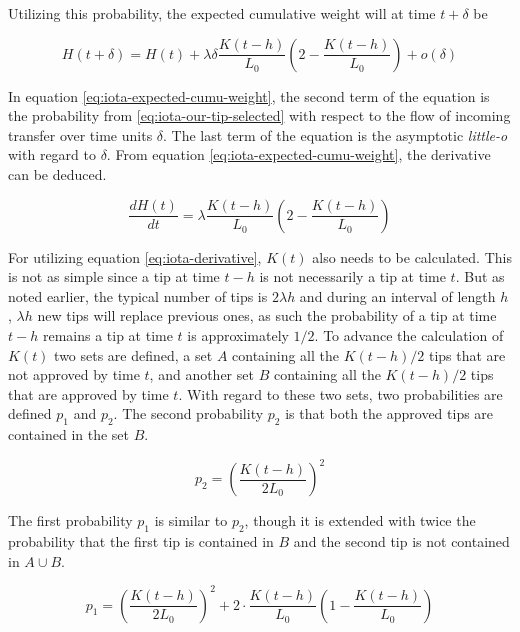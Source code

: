 Utilizing this probability, the expected cumulative weight will at time $t+\delta$ be

\begin{equation}
\label{eq:iota-expected-cumu-weight}
    H(t+ \delta) = H(t) + \lambda \delta \frac{K(t-h)}{L_0}\left(2-\frac{K(t-h)}{L_0}\right) + o(\delta)
\end{equation}

In equation \ref{eq:iota-expected-cumu-weight}, the second term of the equation is the probability from \ref{eq:iota-our-tip-selected} with respect to the flow of incoming transfer over time units $\delta$. The last term of the equation is the asymptotic \emph{little-o} with regard to $\delta$. From equation \ref{eq:iota-expected-cumu-weight}, the derivative can be deduced.

\begin{equation}
\label{eq:iota-derivative}
    \frac{dH(t)}{dt} = \lambda \frac{K(t-h)}{L_0}\left(2-\frac{K(t-h)}{L_0}\right)
\end{equation}


For utilizing equation \ref{eq:iota-derivative}, $K(t)$ also needs to be calculated. This is not as simple since a tip at time $t-h$ is not necessarily a tip at time $t$. But as noted earlier, the typical number of tips is $2\lambda h$ and during an interval of length $h$, $\lambda h$ new tips will replace previous ones, as such the probability of a tip at time $t-h$ remains a tip at time $t$ is approximately $1/2$. To advance the calculation of $K(t)$ two sets are defined, a set $A$ containing all the $K(t-h)/2$ tips that are not approved by time $t$, and another set $B$ containing all the $K(t-h)/2$ tips that are approved by time $t$. With regard to these two sets, two probabilities are defined $p_1$ and $p_2$. The second probability $p_2$ is that both the approved tips are contained in the set $B$.

\begin{equation*}
    p_2 = \left( \frac{K(t-h)}{2L_0} \right)^2
\end{equation*}

The first probability $p_1$ is similar to $p_2$, though it is extended with twice the probability that the first tip is contained in $B$ and the second tip is not contained in $A \cup B$. 

\begin{equation*}
    p_1 = \left( \frac{K(t-h)}{2L_0} \right)^2 + 2 \cdot \frac{K(t-h)}{L_0} \left( 1-\frac{K(t-h)}{L_0} \right)
\end{equation*}

